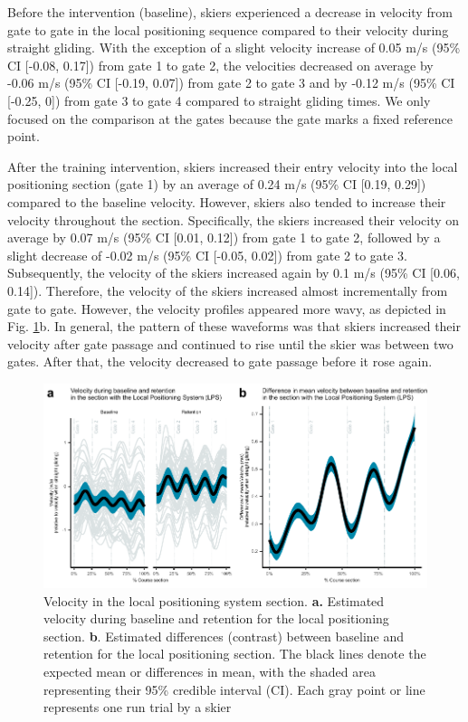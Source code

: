 \documentclass{article}
\begin{document}
Before the intervention (baseline), skiers experienced a decrease in velocity from gate to gate in the local positioning sequence compared to their velocity during straight gliding. With the exception of a slight velocity increase of 0.05 m/s (95\% CI [-0.08, 0.17]) from gate 1 to gate 2, the velocities decreased on average by -0.06 m/s (95\% CI [-0.19, 0.07]) from gate 2 to gate 3 and by -0.12 m/s (95\% CI [-0.25, 0]) from gate 3 to gate 4 compared to straight gliding times. We only focused on the comparison at the gates because the gate marks a fixed reference point.

After the training intervention, skiers increased their entry velocity into the local positioning section (gate 1) by an average of 0.24 m/s (95\% CI [0.19, 0.29]) compared to the baseline velocity. However, skiers also tended to increase their velocity throughout the section. Specifically, the skiers increased their velocity on average by 0.07 m/s (95\% CI [0.01, 0.12]) from gate 1 to gate 2, followed by a slight decrease of -0.02 m/s (95\% CI [-0.05, 0.02]) from gate 2 to gate 3. Subsequently, the velocity of the skiers increased again by 0.1 m/s (95\% CI [0.06, 0.14]). Therefore, the velocity of the skiers increased almost incrementally from gate to gate. However, the velocity profiles appeared more wavy, as depicted in Fig. \ref{fig: velocity}b. In general, the pattern of these waveforms was that skiers increased their velocity after gate passage and continued to rise until the skier was between two gates. After that, the velocity decreased to gate passage before it rose again. 

\begin{figure}[H]
\centering
\includegraphics{figurer/figure_velocity_2.pdf}
\caption{Velocity in the local positioning system section. \textbf{a.} Estimated velocity during baseline and retention for the local positioning section. \textbf{b}. Estimated differences (contrast) between baseline and retention for the local positioning section. The black lines denote the expected mean or differences in mean, with the shaded area representing their 95\% credible interval (CI). Each gray point or line represents one run trial by a skier}\label{fig: velocity}
\end{figure}
\end{document}
